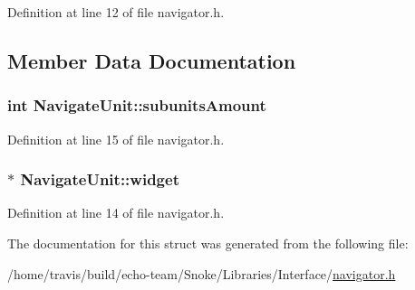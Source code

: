Definition at line 12 of file navigator.\-h.



\subsection{Member Data Documentation}
\hypertarget{struct_navigate_unit_a59e42d03540ccad6017bc708cab71893}{
\subsubsection[{subunits\-Amount}]{\setlength{\rightskip}{0pt plus 5cm}int Navigate\-Unit\-::subunits\-Amount}}\label{struct_navigate_unit_a59e42d03540ccad6017bc708cab71893}


Definition at line 15 of file navigator.\-h.

\hypertarget{struct_navigate_unit_a04a97a78df45d0f2268b8352f64d43f5}{
\subsubsection[{widget}]{$\ast$ Navigate\-Unit\-::widget}}\label{struct_navigate_unit_a04a97a78df45d0f2268b8352f64d43f5}


Definition at line 14 of file navigator.\-h.



The documentation for this struct was generated from the following file\-:\begin{DoxyCompactItemize}
\item 
/home/travis/build/echo-\/team/\-Snoke/\-Libraries/\-Interface/\hyperlink{navigator_8h}{navigator.\-h}\end{DoxyCompactItemize}
